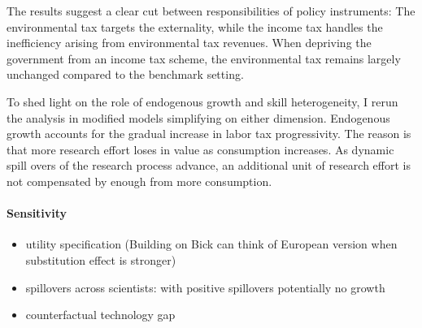 The results suggest a clear cut between responsibilities of policy instruments: The environmental tax targets the externality, while the income tax handles the inefficiency arising from environmental tax revenues. When depriving the government from an income tax scheme, the environmental tax remains largely unchanged compared to the benchmark setting. 

To shed light on the role of endogenous growth and skill heterogeneity, I rerun the analysis in modified models simplifying on either dimension. 
Endogenous growth accounts for the gradual increase in labor tax progressivity. 
The reason is that more research effort loses in value as consumption increases. As dynamic spill overs of the research process advance, an additional unit of research effort is not compensated by enough from more consumption. \textit{}



\paragraph{Sensitivity}
\begin{itemize}
	\item utility specification (Building on Bick can think of European version when substitution effect is stronger)
	\item spillovers across scientists: with positive spillovers potentially no growth
	\item counterfactual technology gap
\end{itemize}


